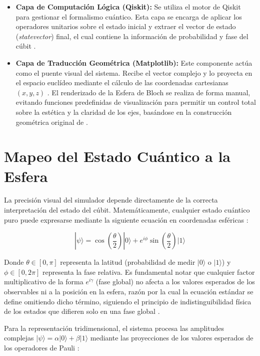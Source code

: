 \documentclass[11pt,a4paper,spanish]{book}
\begin{document}
\begin{itemize}
    \item \textbf{Capa de Computación Lógica (Qiskit):} Se utiliza el motor de Qiskit para gestionar el formalismo cuántico. Esta capa se encarga de aplicar los operadores unitarios sobre el estado inicial y extraer el vector de estado (\textit{statevector}) final, el cual contiene la información de probabilidad y fase del cúbit \citep{qiskit2023}.
    \item \textbf{Capa de Traducción Geométrica (Matplotlib):} Este componente actúa como el puente visual del sistema. Recibe el vector complejo y lo proyecta en el espacio euclídeo mediante el cálculo de las coordenadas cartesianas $(x, y, z)$ \citep{hunter2007}. El renderizado de la Esfera de Bloch se realiza de forma manual, evitando funciones predefinidas de visualización para permitir un control total sobre la estética y la claridad de los ejes, basándose en la construcción geométrica original de \citet{bloch1946}.
\end{itemize}

\section{Mapeo del Estado Cuántico a la Esfera}
La precisión visual del simulador depende directamente de la correcta interpretación del estado del cúbit. Matemáticamente, cualquier estado cuántico puro puede expresarse mediante la siguiente ecuación en coordenadas esféricas \citep{nielsen2010}:

\begin{equation}
|\psi\rangle = \cos\left(\frac{\theta}{2}\right)|0\rangle + e^{i\phi}\sin\left(\frac{\theta}{2}\right)|1\rangle
\end{equation}

Donde $\theta \in [0, \pi]$ representa la latitud (probabilidad de medir $|0\rangle$ o $|1\rangle$) y $\phi \in [0, 2\pi]$ representa la fase relativa. Es fundamental notar que cualquier factor multiplicativo de la forma $e^{i\gamma}$ (fase global) no afecta a los valores esperados de los observables ni a la posición en la esfera, razón por la cual la ecuación estándar se define omitiendo dicho término, siguiendo el principio de indistinguibilidad física de los estados que difieren solo en una fase global \citep{dirac1981, sakurai2017}.

Para la representación tridimensional, el sistema procesa las amplitudes complejas $|\psi\rangle = \alpha|0\rangle + \beta|1\rangle$ mediante las proyecciones de los valores esperados de los operadores de Pauli \citep{pauli1927}:
\end{document}
